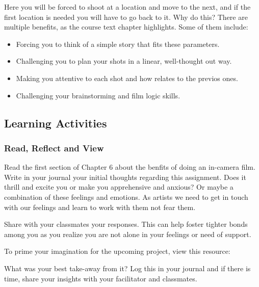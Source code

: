 \documentclass[
]{book}
\providecommand{\tightlist}{%
  \setlength{\itemsep}{0pt}\setlength{\parskip}{0pt}}
\begin{document}
Here you will be forced to shoot at a location and move to the next, and if the first location is needed you will have to go back to it. Why do this? There are multiple benefits, as the course text chapter highlights. Some of them include:

\begin{itemize}
\tightlist
\item
  Forcing you to think of a simple story that fits these parameters.\\
\item
  Challenging you to plan your shots in a linear, well-thought out way.\\
\item
  Making you attentive to each shot and how relates to the previos ones.\\
\item
  Challenging your brainstorming and film logic skills.
\end{itemize}

\hypertarget{learning-activities-18}{%
\subsection*{Learning Activities}\label{learning-activities-18}}

\begin{reflect}
\hypertarget{read-reflect-and-view}{%
\subsubsection*{Read, Reflect and View}\label{read-reflect-and-view}}

Read the first section of Chapter 6 about the benfits of doing an in-camera film. Write in your journal your initial thoughts regarding this assignment. Does it thrill and excite you or make you apprehensive and anxious? Or maybe a combination of these feelings and emotions. As artists we need to get in touch with our feelings and learn to work with them not fear them.

Share with your classmates your responses. This can help foster tighter bonds among you as you realize you are not alone in your feelings or need of support.

To prime your imagination for the upcoming project, view this resource:

What was your best take-away from it? Log this in your journal and if there is time, share your insights with your facilitator and classmates.
\end{reflect}
\end{document}
